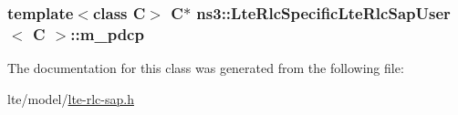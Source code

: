 \subsubsection[{\texorpdfstring{m\+\_\+pdcp}{m_pdcp}}]{\setlength{\rightskip}{0pt plus 5cm}template$<$class C$>$ {\bf C}$\ast$ {\bf ns3\+::\+Lte\+Rlc\+Specific\+Lte\+Rlc\+Sap\+User}$<$ {\bf C} $>$\+::m\+\_\+pdcp\hspace{0.3cm}{\ttfamily [private]}}\hypertarget{classns3_1_1LteRlcSpecificLteRlcSapUser_a1215108463fa5323fecf31d8970a7253}{}\label{classns3_1_1LteRlcSpecificLteRlcSapUser_a1215108463fa5323fecf31d8970a7253}


The documentation for this class was generated from the following file\+:\begin{DoxyCompactItemize}
\item 
lte/model/\hyperlink{lte-rlc-sap_8h}{lte-\/rlc-\/sap.\+h}\end{DoxyCompactItemize}
